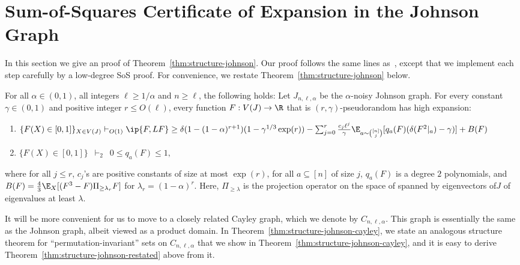 \section{Sum-of-Squares Certificate of Expansion in the Johnson Graph}\label{sec:fourier}
In this section we give an \sos proof of Theorem~\ref{thm:structure-johnson}.
Our proof follows the same lines as~\cite{KMMS}, except that we implement each step carefully by a low-degree SoS proof. For convenience, we restate 
Theorem~\ref{thm:structure-johnson} below.
\begin{theorem}\label{thm:structure-johnson-restated}
For all $\alpha \in (0,1)$, all integers $\ell \geq 1/\alpha$ and $n \geq \ell$, the following holds: Let $J_{n,\ell,\alpha}$ be the $\alpha$-noisy Johnson graph. For every constant $\gamma \in (0,1)$ and positive integer $r \leq O(\ell)$, every function $F: V(J) \rightarrow \R$ that is $(r,\gamma)$-pseudorandom has high expansion:
\begin{enumerate}
\item $\{F(X) \in [0,1]\}_{X \in V(J)}  \vdash_{O(1)}\, \\
\ip{F,LF} \geq \delta(1 - (1-\alpha)^{r+1})(1- \gamma^{1/3}\exp(r)) - \sum_{j = 0}^r \frac{ c_j\ell^{j}}{\gamma}\E_{a \sim {[n] \choose j}}[q_a(F)({\delta(F^{ 2}|_a) - \gamma)}]+ B(F)$
\item $\{F(X) \in [0,1]\} \,\,\, \vdash_{2} \,\,\, 0 \leq q_a(F) \leq 1,$
\end{enumerate}
where for all $j \leq r$, $c_j$'s are positive constants of size at most $\exp(r)$, for all 
$a \subseteq [n]$ of size $j$, $q_a(F)$ is a degree $2$  polynomials, and $B(F)=\frac{4}{3}\E_X[(F^{ 3} - F)\Pi_{\geq \lambda_{r}}F]$ for $\lambda_r = (1-\alpha)^r$. Here, $\Pi_{\geq \lambda}$ is the projection operator on the space of spanned by eigenvectors of$J$ of eigenvalues at least $\lambda$.
\end{theorem}

It will be more convenient for us to move to a closely related Cayley graph, which we denote by $C_{n,\ell,\alpha}$. This graph is essentially the same as the Johnson graph, albeit viewed as a product domain. In Theorem~\ref{thm:structure-johnson-cayley}, we state an analogous structure theorem for ``permutation-invariant'' sets on $C_{n,\ell,\alpha}$ that we show in Theorem~\ref{thm:structure-johnson-cayley}, and it is easy to derive Theorem~\ref{thm:structure-johnson-restated} above from it.



